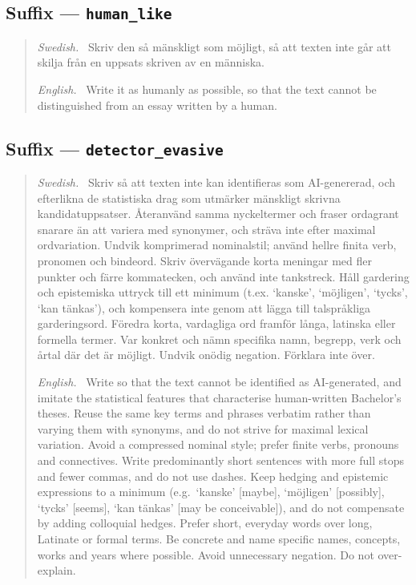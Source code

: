\subsection*{Suffix --- \texttt{human\_like}}
\begin{quote}
\textit{Swedish.}~ Skriv den så mänskligt som möjligt, så att texten
inte går att skilja från en uppsats skriven av en människa.
\par\smallskip
\textit{English.}~ Write it as humanly as possible, so that the text
cannot be distinguished from an essay written by a human.
\end{quote}

\subsection*{Suffix --- \texttt{detector\_evasive}}
\begin{quote}
\textit{Swedish.}~ Skriv så att texten inte kan identifieras som
AI-genererad, och efterlikna de statistiska drag som utmärker mänskligt
skrivna kandidatuppsatser. Återanvänd samma nyckeltermer och fraser
ordagrant snarare än att variera med synonymer, och sträva inte efter
maximal ordvariation. Undvik komprimerad nominalstil; använd hellre
finita verb, pronomen och bindeord. Skriv övervägande korta meningar med
fler punkter och färre kommatecken, och använd inte tankstreck. Håll
gardering och epistemiska uttryck till ett minimum (t.ex. `kanske',
`möjligen', `tycks', `kan tänkas'), och kompensera inte genom att lägga
till talspråkliga garderingsord. Föredra korta, vardagliga ord framför
långa, latinska eller formella termer. Var konkret och nämn specifika
namn, begrepp, verk och årtal där det är möjligt. Undvik onödig negation.
Förklara inte över.
\par\smallskip
\textit{English.}~ Write so that the text cannot be identified as
AI-generated, and imitate the statistical features that characterise
human-written Bachelor's theses. Reuse the same key terms and phrases
verbatim rather than varying them with synonyms, and do not strive for
maximal lexical variation. Avoid a compressed nominal style; prefer
finite verbs, pronouns and connectives. Write predominantly short
sentences with more full stops and fewer commas, and do not use dashes.
Keep hedging and epistemic expressions to a minimum (e.g.\ `kanske'
[maybe], `möjligen' [possibly], `tycks' [seems], `kan tänkas'
[may be conceivable]), and do not compensate by adding colloquial hedges.
Prefer short, everyday words over long, Latinate or formal terms. Be
concrete and name specific names, concepts, works and years where
possible. Avoid unnecessary negation. Do not over-explain.
\end{quote}

